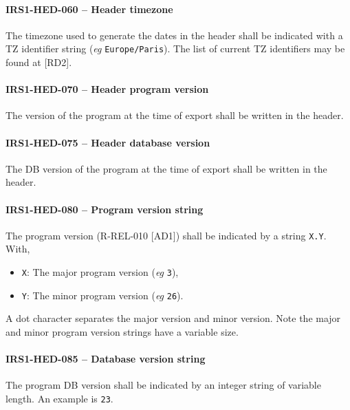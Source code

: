 \paragraph{IRS1-HED-060 -- Header timezone}
The timezone used to generate the dates in the header shall be indicated
with a TZ identifier string (\textit{eg} \lstinline{Europe/Paris}).
The list of current TZ identifiers may be found at [RD2].

\paragraph{IRS1-HED-070 -- Header program version}
The version of the program at the time of export shall be written
in the header.

\paragraph{IRS1-HED-075 -- Header database version}
The \gls{DB} version of the program at the time of export shall
be written in the header.

\paragraph{IRS1-HED-080 -- Program version string}
The program version (R-REL-010 [AD1]) shall be indicated by a string
\lstinline{X.Y}. With,
\begin{itemize}
\item \lstinline{X}: The major program version (\textit{eg} \lstinline{3}),
\item \lstinline{Y}: The minor program version (\textit{eg} \lstinline{26}).
\end{itemize}

A dot character separates the major version and minor version.
Note the major and minor program version strings have a variable size.

\paragraph{IRS1-HED-085 -- Database version string}
The program \gls{DB} version shall be indicated by an integer string
of variable length. An example is \lstinline{23}.

